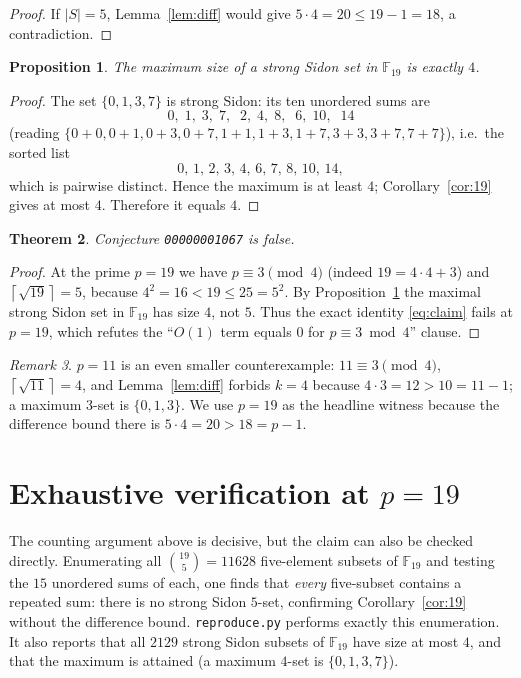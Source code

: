 \documentclass[11pt]{article}
\newtheorem{theorem}{Theorem}
\newtheorem{proposition}[theorem]{Proposition}
\theoremstyle{definition}
\theoremstyle{remark}
\newtheorem{remark}[theorem]{Remark}
\newcommand{\F}{\mathbb{F}}
\newcommand{\ceil}[1]{\left\lceil #1 \right\rceil}
\begin{document}
\begin{proof}
If $|S| = 5$, Lemma~\ref{lem:diff} would give $5\cdot 4 = 20 \le 19 - 1 = 18$,
a contradiction.
\end{proof}

\begin{proposition}\label{prop:max4}
The maximum size of a strong Sidon set in $\F_{19}$ is exactly $4$.
\end{proposition}

\begin{proof}
The set $\{0,1,3,7\}$ is strong Sidon: its ten unordered sums are
\[
0,\;1,\;3,\;7,\;\;2,\;4,\;8,\;\;6,\;10,\;\;14
\]
(reading $\{0+0, 0+1, 0+3, 0+7, 1+1, 1+3, 1+7, 3+3, 3+7, 7+7\}$), i.e.\ the
sorted list
\[
0,\,1,\,2,\,3,\,4,\,6,\,7,\,8,\,10,\,14 ,
\]
which is pairwise distinct. Hence the maximum is at least $4$;
Corollary~\ref{cor:19} gives at most $4$. Therefore it equals $4$.
\end{proof}

\begin{theorem}\label{thm:false}
Conjecture \texttt{00000001067} is false.
\end{theorem}

\begin{proof}
At the prime $p = 19$ we have $p \equiv 3 \pmod 4$ (indeed $19 = 4\cdot 4 + 3$)
and $\ceil{\sqrt{19}} = 5$, because $4^2 = 16 < 19 \le 25 = 5^2$. By
Proposition~\ref{prop:max4} the maximal strong Sidon set in $\F_{19}$ has size
$4$, not $5$. Thus the exact identity \eqref{eq:claim} fails at $p = 19$, which
refutes the ``$O(1)$ term equals $0$ for $p \equiv 3 \bmod 4$'' clause.
\end{proof}

\begin{remark}
$p = 11$ is an even smaller counterexample: $11 \equiv 3 \pmod 4$,
$\ceil{\sqrt{11}} = 4$, and Lemma~\ref{lem:diff} forbids $k = 4$ because
$4 \cdot 3 = 12 > 10 = 11 - 1$; a maximum $3$-set is $\{0,1,3\}$. We use
$p = 19$ as the headline witness because the difference bound there is
$5 \cdot 4 = 20 > 18 = p-1$.
\end{remark}

\section{Exhaustive verification at $p = 19$}

The counting argument above is decisive, but the claim can also be checked
directly. Enumerating all $\binom{19}{5} = 11628$ five-element subsets of
$\F_{19}$ and testing the $15$ unordered sums of each, one finds that
\emph{every} five-subset contains a repeated sum: there is no strong Sidon
$5$-set, confirming Corollary~\ref{cor:19} without the difference bound.
\texttt{reproduce.py} performs exactly this enumeration. It also reports that
all $2129$ strong Sidon subsets of $\F_{19}$ have size at most $4$, and that
the maximum is attained (a maximum $4$-set is $\{0,1,3,7\}$).
\end{document}
